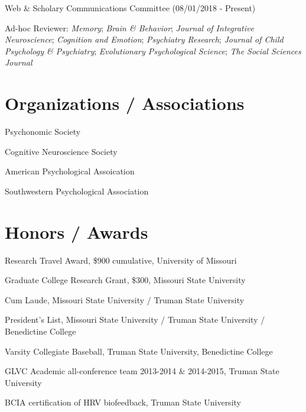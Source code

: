 \documentclass[11pt, a4paper]{awesome-cv}
\begin{document}
Web \& Scholary Communications Committee (08/01/2018 - Present)

Ad-hoc Reviewer: \emph{Memory}; \emph{Brain \& Behavior}; \emph{Journal of Integrative Neuroscience}; \emph{Cognition and Emotion}; \emph{Psychiatry Research}; \emph{Journal of Child Psychology \& Psychiatry}; \emph{Evolutionary Psychological Science}; \emph{The Social Sciences Journal}

\hypertarget{organizations-associations}{%
\section{Organizations / Associations}\label{organizations-associations}}

Psychonomic Society

Cognitive Neuroscience Society

American Psychological Assoication

Southwestern Psychological Association

\hypertarget{honors-awards}{%
\section{Honors / Awards}\label{honors-awards}}

Research Travel Award, \$900 cumulative, University of Missouri

Graduate College Research Grant, \$300, Missouri State University

Cum Laude, Missouri State University / Truman State University

President's List, Missouri State University / Truman State University / Benedictine College

Varsity Collegiate Baseball, Truman State University, Benedictine College

GLVC Academic all-conference team 2013-2014 \& 2014-2015, Truman State University

BCIA certification of HRV biofeedback, Truman State University
\end{document}
